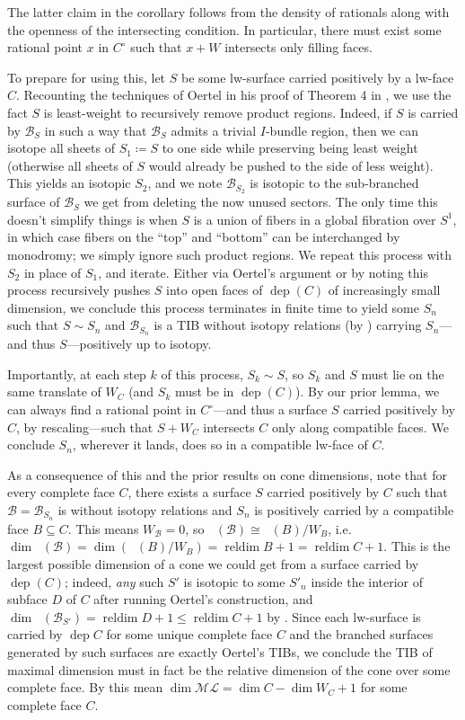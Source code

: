 \documentclass[12pt]{article}
\newcommand{\B}{\mathcal{B}}
\newcommand{\ML}{\mathcal{ML}}
\DeclareMathOperator{\dep}{dep}
\DeclareMathOperator{\cone}{cone^\circ}
\DeclareMathOperator{\reldim}{reldim}
\renewcommand{\le}{\leqslant}
\renewcommand{\it}{\textit}
\theoremstyle{nonumberdefinition}
\theoremstyle{empty}
\theoremstyle{empty}
\begin{document}
The latter claim in the corollary follows from the density of rationals along with the openness of the intersecting condition. In particular, there must exist some rational point $x$ in $C^\circ$ such that $x + W$ intersects only filling faces.

To prepare for using this, let $S$ be some lw-surface carried positively by a lw-face $C$. Recounting the techniques of Oertel in his proof of Theorem 4 in \cite{oertelIncompressibleBranchedSurfaces1984}, we use the fact $S$ is least-weight to recursively remove product regions. Indeed, if $S$ is carried by $\B_S$ in such a way that $\B_S$ admits a trivial $I$-bundle region, then we can isotope all sheets of $S_1 \coloneqq S$ to one side while preserving being least weight (otherwise all sheets of $S$ would already be pushed to the side of less weight). This yields an isotopic $S_2$, and we note $\B_{S_2}$ is isotopic to the sub-branched surface of $\B_S$ we get from deleting the now unused sectors. The only time this doesn't simplify things is when $S$ is a union of fibers in a global fibration over $S^1$, in which case fibers on the ``top'' and ``bottom'' can be interchanged by monodromy; we simply ignore such product regions. We repeat this process with $S_2$ in place of $S_1$, and iterate. Either via Oertel's argument or by noting this process recursively pushes $S$ into open faces of $\dep(C)$ of increasingly small dimension, we conclude this process terminates in finite time to yield some $S_n$ such that $S \sim S_n$ and $\B_{S_n}$ is a TIB without isotopy relations (by \cite{oertelMeasuredLaminations3Manifolds1988}) carrying $S_n$---and thus $S$---positively up to isotopy.

Importantly, at each step $k$ of this process, $S_k \sim S$, so $S_k$ and $S$ must lie on the same translate of $W_C$ (and $S_k$ must be in $\dep(C)$). By our prior lemma, we can always find a rational point in $C^\circ$---and thus a surface $S$ carried positively by $C$, by rescaling---such that $S + W_C$ intersects $C$ only along compatible faces. We conclude $S_n$, wherever it lands, does so in a compatible lw-face of $C$. 

As a consequence of this and the prior results on cone dimensions, note that for every complete face $C$, there exists a surface $S$ carried positively by $C$ such that $\B = \B_{S_n}$ is without isotopy relations and $S_n$ is positively carried by a compatible face $B \subseteq C$. This means $W_\B = 0$, so $\cone(\B) \cong \cone(B)/W_B$, i.e. $\dim \cone(\B) = \dim(\cone(B)/W_B) = \reldim B + 1 = \reldim C + 1$. This is the largest possible dimension of a cone we could get from a surface carried by $\dep(C)$; indeed, \it{any} such $S'$ is isotopic to some $S'_n$ inside the interior of subface $D$ of $C$ after running Oertel's construction, and $\dim \cone(\B_{S'}) = \reldim D + 1 \le \reldim C + 1$ by . Since each lw-surface is carried by $\dep C$ for some unique complete face $C$ and the branched surfaces generated by such surfaces are exactly Oertel's TIBs, we conclude the TIB of maximal dimension must in fact be the relative dimension of the cone over some complete face. By  this mean $\dim \ML = \dim C - \dim W_C + 1$ for some complete face $C$. 
\end{document}
